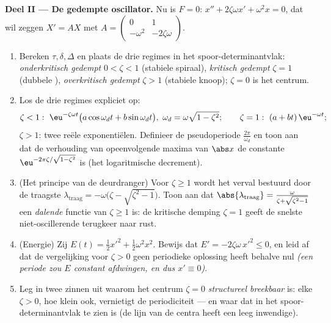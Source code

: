 \begin{problem}
\medskip
\noindent\textbf{Deel II --- De gedempte oscillator.} Nu is $F =
0$: $x'' + 2\zeta\omega x' + \omega^2x = 0$, dat wil zeggen $X' =
AX$ met $A = \begin{pmatrix} 0 & 1\\ -\omega^2 &
-2\zeta\omega\end{pmatrix}$.
\begin{enumerate}[resume]
  \item Bereken $\tau, \delta, \Delta$ en plaats de drie regimes in
        het spoor-determinantvlak: \emph{onderkritisch gedempt} $0
        < \zeta < 1$ (stabiele spiraal), \emph{kritisch gedempt}
        $\zeta = 1$ (dubbele ), \emph{overkritisch
        gedempt} $\zeta > 1$ (stabiele knoop); $\zeta = 0$ is het
        centrum.
  \item Los de drie regimes expliciet op:
        \[
        \zeta < 1:\ \eu^{-\zeta\omega t}\bigl(a\cos\omega_d t
        + b\sin\omega_dt\bigr),\ \omega_d =
        \omega\sqrt{1-\zeta^2};
        \qquad
        \zeta = 1:\ (a + bt)\,\eu^{-\omega t};
        \]
        $\zeta > 1$: twee reële exponentiëlen. Definieer de
        pseudoperiode $\frac{2\pi}{\omega_d}$ en toon aan dat de
        verhouding van opeenvolgende maxima van $\abs x$ de
        constante $\eu^{-2\pi\zeta/\sqrt{1-\zeta^2}}$ is (het
        logaritmische decrement).
  \item (Het principe van de deurdranger) Voor $\zeta \geq 1$ wordt
        het verval bestuurd door de traagste 
        $\lambda_{\mathrm{traag}} = -\omega\bigl(\zeta -
        \sqrt{\zeta^2-1}\bigr)$. Toon aan dat
        $\abs{\lambda_{\mathrm{traag}}} = \frac{\omega}{\zeta +
        \sqrt{\zeta^2 - 1}}$ een \emph{dalende} functie van $\zeta
        \geq 1$ is: de kritische demping $\zeta = 1$ geeft de
        snelste niet-oscillerende terugkeer naar rust.
  \item (Energie) Zij $E(t) = \frac12x'^2 + \frac12\omega^2x^2$.
        Bewijs dat $E' = -2\zeta\omega\,x'^2 \leq 0$, en leid af
        dat de vergelijking voor $\zeta > 0$ geen periodieke
        oplossing heeft behalve nul \emph{(een periode zou $E$
        constant afdwingen, en dus $x' \equiv 0$)}.
  \item Leg in twee zinnen uit waarom het centrum $\zeta = 0$
        \emph{structureel breekbaar} is: elke $\zeta > 0$, hoe
        klein ook, vernietigt de periodiciteit --- en waar dat in
        het spoor-determinantvlak te zien is (de lijn van de centra
        heeft een leeg inwendige).
\end{enumerate}


\end{problem}
